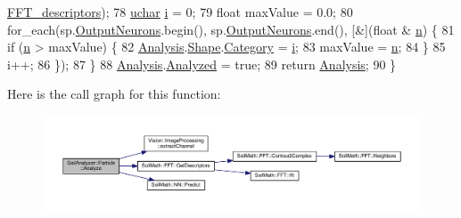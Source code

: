 \begin{DoxyCode}
      \hyperlink{class_shape_classification_afecc3c98ca8a930b359ddd936aad21f3}{FFT\_descriptors});
78     \hyperlink{_soil_math_types_8h_a65f85814a8290f9797005d3b28e7e5fc}{uchar} \hyperlink{_comparision_pictures_2_createtest_image_8m_a6f6ccfcf58b31cb6412107d9d5281426}{i} = 0;
79     \textcolor{keywordtype}{float} maxValue = 0.0;
80     for\_each(sp.\hyperlink{struct_predict__struct_aa0708cae93baa061f21452537e86d3bd}{OutputNeurons}.begin(), sp.\hyperlink{struct_predict__struct_aa0708cae93baa061f21452537e86d3bd}{OutputNeurons}.end(), [&](\textcolor{keywordtype}{float} &
      \hyperlink{_comparision_pictures_2_createtest_image_8m_aeab71244afb687f16d8c4f5ee9d6ef0e}{n}) \{
81       \textcolor{keywordflow}{if} (\hyperlink{_comparision_pictures_2_createtest_image_8m_aeab71244afb687f16d8c4f5ee9d6ef0e}{n} > maxValue) \{
82         \hyperlink{class_soil_analyzer_1_1_particle_a4df8d4d8fb130bce05fef5d4601ef89e}{Analysis}.\hyperlink{class_soil_analyzer_1_1_particle_analysis_results_a75230aa0675b2df489c08bcfffb43b97}{Shape}.\hyperlink{class_shape_classification_a5b723e358b86496ed6f4b25e2bf7af17}{Category} = \hyperlink{_comparision_pictures_2_createtest_image_8m_a6f6ccfcf58b31cb6412107d9d5281426}{i};
83         maxValue = \hyperlink{_comparision_pictures_2_createtest_image_8m_aeab71244afb687f16d8c4f5ee9d6ef0e}{n};
84       \}
85       i++;
86     \});
87   \}
88   \hyperlink{class_soil_analyzer_1_1_particle_a4df8d4d8fb130bce05fef5d4601ef89e}{Analysis}.\hyperlink{class_soil_analyzer_1_1_particle_analysis_results_abfb8465c0cfbe9a6ad4d844f6269676f}{Analyzed} = \textcolor{keyword}{true};
89   \textcolor{keywordflow}{return} \hyperlink{class_soil_analyzer_1_1_particle_a4df8d4d8fb130bce05fef5d4601ef89e}{Analysis};
90 \}
\end{DoxyCode}


Here is the call graph for this function\+:
\nopagebreak
\begin{figure}[H]
\begin{center}
\leavevmode
\includegraphics[width=350pt]{class_soil_analyzer_1_1_particle_aeb4ed9f49b88f5d6563b993154aabe50_cgraph}
\end{center}
\end{figure}


